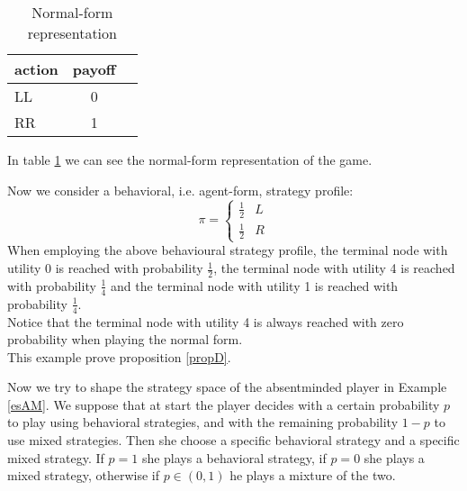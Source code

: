 \begin{example}
\begin{table}[h]
	\begin{center} 
		\begin{tabular}{|l|c|r|}
			
			\hline
			action & payoff \\
			\hline
			\hline
			LL & 0 \\
			\hline
			RR & 1 \\
			\hline
		\end{tabular}
	\end{center}
	\caption{Normal-form representation}\label{tabNF}
\end{table}

\noindent
In table \ref{tabNF} we can see the normal-form representation of the game.

\noindent
Now we consider a behavioral, i.e. agent-form, strategy profile:
\begin{equation}\label{agent}
\pi=
\begin{cases}
\frac{1}{2}&L\\
\frac{1}{2}&R
\end{cases}
\end{equation}
\noindent
When employing the above behavioural strategy profile, the terminal node with utility 0 is reached with probability $\frac{1}{2}$, the terminal node with utility 4 is reached with probability $\frac{1}{4}$ and the terminal node with utility 1 is reached with probability $\frac{1}{4}$. \\
Notice that the terminal node with utility 4 is always reached with zero probability when playing the normal form.\\
This example prove proposition \ref{propD}.

\end{example}
\noindent
Now we try to shape the strategy space of the absentminded player in Example \ref{esAM}. We suppose that at start the player decides with a certain probability $p$ to play using behavioral strategies, and with the remaining probability $1-p$ to use mixed strategies. Then she choose a specific behavioral strategy and a specific mixed strategy. If $p=1$ she plays a behavioral strategy, if $p=0$ she plays a mixed strategy, otherwise if $p \in (0,1)$ he plays a mixture of the two.

